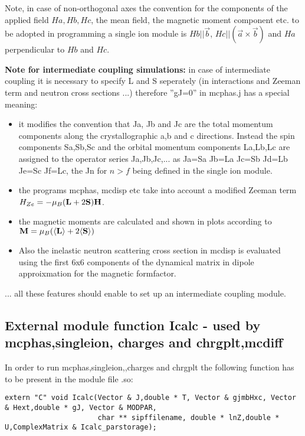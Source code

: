 Note, in case of non-orthogonal axes the convention for the components
of the applied field $Ha, Hb,Hc$, the mean field, the magnetic moment 
component etc. to be adopted in programming a single ion module is
 $Hb||\vec b$, $Hc||(\vec a \times \vec b)$ and $Ha$ perpendicular to $Hb$ and $Hc$.


{\bf Note for intermediate coupling simulations:} in case of intermediate coupling
it is necessary to specify
L and S seperately (in interactions and Zeeman term and neutron cross sections ...)
therefore  ''gJ=0'' in {\prg mcphas.j} has a special meaning:
\begin{itemize}
\item  it modifies
the convention that Ja, Jb and Jc are the total momentum components along the
crystallographic a,b and c directions. Instead
the spin components Sa,Sb,Sc and the orbital momentum components La,Lb,Lc are
assigned to the operator series Ja,Jb,Jc,... as  Ja=Sa Jb=La Jc=Sb Jd=Lb Je=Sc 
Jf=Lc, the Jn for $n>f$ being defined in the single ion module. 
\item the programs {\prg mcphas, mcdisp etc} take into account
 a modified Zeeman term $H_{Ze}=-\mu_B(\mathbf L+2\mathbf S)\mathbf H$.
\item the magnetic moments are calculated and shown in plots according 
to $\mathbf M=\mu_B(\langle \mathbf L\rangle+2\langle \mathbf S\rangle)$
\item Also the inelastic neutron scattering cross section in {\prg mcdisp} is evaluated using the %
first
6x6 components of the dynamical matrix  in dipole approixmation for the magnetic formfactor.
\end{itemize}
... all these features should enable to set up an intermediate coupling module.


\subsection{External module function {\prg Icalc} - used by {\prg mcphas},{\prg singleion},{\prg %
charges} and {\prg chrgplt},{\prg mcdiff} }

In order to run {\prg mcphas},{\prg singleion},,{\prg charges} and {\prg %
chrgplt} the following function has to be 
present in the module file {\prg *.so}:

\begin{verbatim}
extern "C" void Icalc(Vector & J,double * T, Vector & gjmbHxc, Vector & Hext,double * gJ, Vector & MODPAR,
                      char ** sipffilename, double * lnZ,double * U,ComplexMatrix & Icalc_parstorage);
\end{verbatim}

